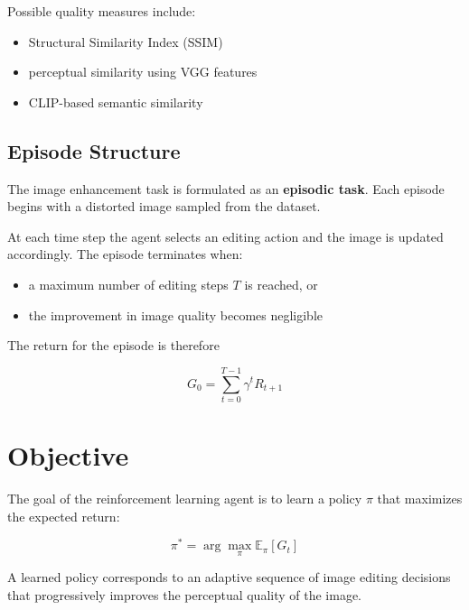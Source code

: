 \documentclass[11pt]{article}
\begin{document}
Possible quality measures include:

\begin{itemize}
\item Structural Similarity Index (SSIM)
\item perceptual similarity using VGG features
\item CLIP-based semantic similarity
\end{itemize}

\subsection{Episode Structure}

The image enhancement task is formulated as an \textbf{episodic task}. Each episode begins with a distorted image sampled from the dataset.

At each time step the agent selects an editing action and the image is updated accordingly. The episode terminates when:

\begin{itemize}
\item a maximum number of editing steps $T$ is reached, or
\item the improvement in image quality becomes negligible
\end{itemize}

The return for the episode is therefore

\[
G_0 = \sum_{t=0}^{T-1} \gamma^t R_{t+1}
\]

\section{Objective}

The goal of the reinforcement learning agent is to learn a policy $\pi$ that maximizes the expected return:

\[
\pi^* = \arg\max_{\pi} \mathbb{E}_\pi [G_t]
\]

A learned policy corresponds to an adaptive sequence of image editing decisions that progressively improves the perceptual quality of the image.



\end{document}
